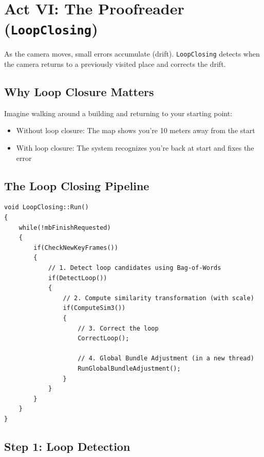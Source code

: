 \section{Act VI: The Proofreader (\texttt{LoopClosing})}

As the camera moves, small errors accumulate (drift). \texttt{LoopClosing} detects when the camera returns to a previously visited place and corrects the drift.

\subsection{Why Loop Closure Matters}

Imagine walking around a building and returning to your starting point:
\begin{itemize}
    \item Without loop closure: The map shows you're 10 meters away from the start
    \item With loop closure: The system recognizes you're back at start and fixes the error
\end{itemize}

\subsection{The Loop Closing Pipeline}

\begin{lstlisting}[caption={LoopClosing::Run() simplified}]
void LoopClosing::Run()
{
    while(!mbFinishRequested)
    {
        if(CheckNewKeyFrames())
        {
            // 1. Detect loop candidates using Bag-of-Words
            if(DetectLoop())
            {
                // 2. Compute similarity transformation (with scale)
                if(ComputeSim3())
                {
                    // 3. Correct the loop
                    CorrectLoop();
                    
                    // 4. Global Bundle Adjustment (in a new thread)
                    RunGlobalBundleAdjustment();
                }
            }
        }
    }
}
\end{lstlisting}

\subsection{Step 1: Loop Detection}

